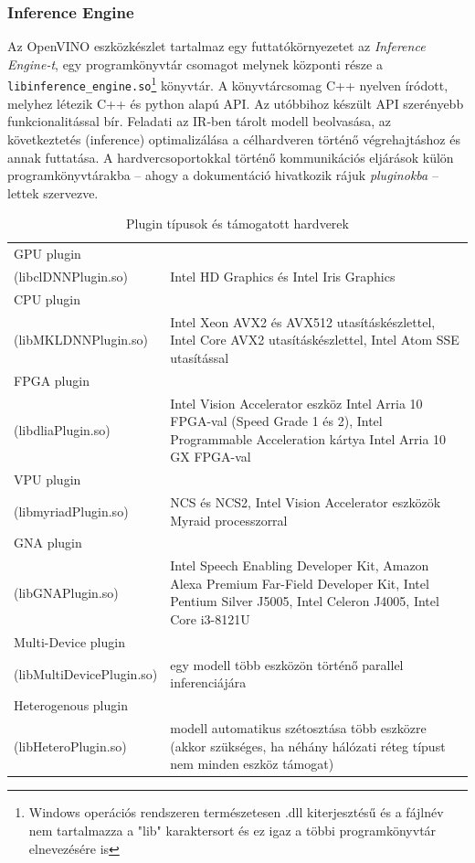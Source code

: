 \subsubsection{Inference Engine}
Az OpenVINO eszközkészlet tartalmaz egy futtatókörnyezetet az \emph{Inference Engine-t}, egy programkönyvtár csomagot melynek központi része a \verb|libinference_engine.so|\footnote{Windows operációs rendszeren természetesen .dll kiterjesztésű és a fájlnév nem tartalmazza a "lib" karaktersort és ez igaz a többi programkönyvtár elnevezésére is} könyvtár. A könyvtárcsomag C++ nyelven íródott, melyhez létezik C++ és python alapú API. Az utóbbihoz készült API szerényebb funkcionalitással bír. Feladati az IR-ben tárolt modell beolvasása, az következtetés (inference) optimalizálása a célhardveren történő végrehajtáshoz  és annak futtatása. A hardvercsoportokkal történő kommunikációs eljárások külön programkönyvtárakba -- ahogy a dokumentáció hivatkozik rájuk \emph{pluginokba} -- lettek szervezve.
\begin{table}[h]
	\centering
	\begin{tabular}{ p{} | p{} }
		GPU plugin\\(libclDNNPlugin.so) & Intel HD Graphics és Intel Iris Graphics  \\ \hline
		CPU plugin\\(libMKLDNNPlugin.so) & Intel Xeon AVX2 és AVX512 utasításkészlettel, Intel Core AVX2 utasításkészlettel, Intel Atom SSE utasítással \\ \hline
		FPGA plugin\\(libdliaPlugin.so) & Intel Vision Accelerator %
		eszköz Intel Arria 10 FPGA-val (Speed Grade 1 és 2), Intel Programmable Acceleration kártya Intel Arria 10 GX FPGA-val \\ \hline
		VPU plugin\\(libmyriadPlugin.so) & NCS és NCS2, Intel Vision Accelerator %
		eszközök Myraid processzorral\\ \hline
		GNA plugin\\(libGNAPlugin.so) & Intel Speech Enabling Developer Kit, Amazon Alexa Premium Far-Field Developer Kit, Intel Pentium Silver J5005, Intel Celeron J4005, Intel Core i3-8121U \\ \hline
		Multi-Device plugin\\(libMultiDevicePlugin.so) & egy modell több eszközön történő parallel inferenciájára\\ \hline
		Heterogenous plugin\\(libHeteroPlugin.so) & modell automatikus szétosztása több eszközre (akkor szükséges, ha néhány hálózati réteg típust nem minden eszköz támogat)
	\end{tabular}
	\caption{Plugin típusok és támogatott hardverek}
	\label{table:IEplugins}
\end{table}

